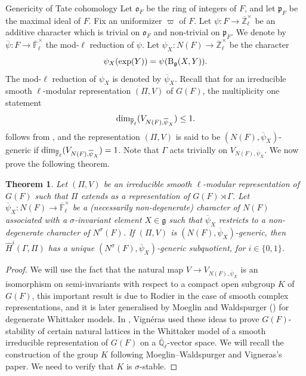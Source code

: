 \documentclass[10pt, reqno]{amsart}
\theoremstyle{plain}
\numberwithin{equation}{section}
\newtheorem{theorem}{Theorem}[section]
\begin{document}
\begin{section}{Genericity of Tate cohomology}
  Let $\mathfrak{o}_F$ be the ring of integers of $F$, and let
  $\mathfrak{p}_F$ be the maximal ideal of $F$. Fix an uniformizer
  $\varpi$ of $F$. Let
  $\psi:F\rightarrow \overline{\mathbb{Z}}_\ell^\times$ be an additive
  character which is trivial on $\mathfrak{o}_F$ and non-trivial on
  $\mathfrak{p}_F$. We denote by
  $\overline{\psi}:F\rightarrow \overline{\mathbb{F}}_\ell^\times$ the
  mod-$\ell$ reduction of $\psi$.  Let
  $\psi_X:N(F)\rightarrow \overline{\mathbb{Z}}_\ell^\times$ be the
  character
$$\psi_X({\rm exp}(Y))=\psi({\rm B}_\mathfrak{g}(X, Y)).$$
The mod-$\ell$ reduction of $\psi_X$ is denoted by
$\overline{\psi}_X$.  Recall that for an irreducible smooth
$\ell$-modular representation $(\Pi,V)$ of $G(F)$, the multiplicity
one statement
$$ {\rm dim}_{\overline{\mathbb{F}}_\ell}(V_{N(F),\overline{\psi}_X}) \leq 1.$$
follows from \cite[Corollary 7.2]{nadir_whit_model}, and the representation
$(\Pi,V)$ is said to be $(N(F),\overline{\psi}_X)$-generic if 
${\rm dim}_{\overline{\mathbb{F}}_\ell}(V_{N(F),\overline{\psi}_X})=1$. 
Note that $\Gamma$ acts trivially on $V_{N(F),\overline{\psi}_X}$. 
We now prove the following theorem.
\begin{theorem}
  Let $(\Pi, V)$ be an irreducible smooth $\ell$-modular
  representation of $G(F)$ such that $\Pi$ extends as a representation
  of $G(F)\rtimes\Gamma$.  Let
  $\overline{\psi}_X:N(F)\rightarrow
  \overline{\mathbb{F}}_\ell^\times$ be a (necessarily non-degenerate)
  character of $N(F)$ associated with a $\sigma$-invariant element
  $X\in \mathfrak{g}$ such that $\overline{\psi}_X$ restricts to a
  non-degenerate character of $N^\sigma(F)$.  If $(\Pi, V)$ is
  $(N(F), \overline{\psi}_X)$-generic, then
  $\widehat{H}^i(\Gamma, \Pi)$ has a unique
  $(N^\sigma(F), \overline{\psi}_X)$-generic subquotient, for
  $i\in \{0,1\}$.
\end{theorem}
\begin{proof}
  We will use the fact that the natural map
  $V\rightarrow V_{N(F), \overline{\psi}_X}$ is an isomorphism on
  semi-invariants with respect to a compact open subgroup $K$ of
  $G(F)$, this important result is due to Rodier in the case of smooth
  complex representations, and it is later generalised by Moeglin and
  Waldspurger (\cite{MW_paper}) for degenerate Whittaker models. In
  \cite[Section III]{Vigneras_Highest_Whittaker_model}, Vign\'eras
  used these ideas to prove $G(F)$-stability of certain natural
  lattices in the Whittaker model of a smooth irreducible
  representation of $G(F)$ on a $\overline{\mathbb{Q}}_\ell$-vector
  space. We will recall the construction of the group $K$ following
  Moeglin--Waldspurger and Vigneras's paper. We need to verify that
  $K$ is $\sigma$-stable.


\end{proof}
\end{section}
\end{document}
